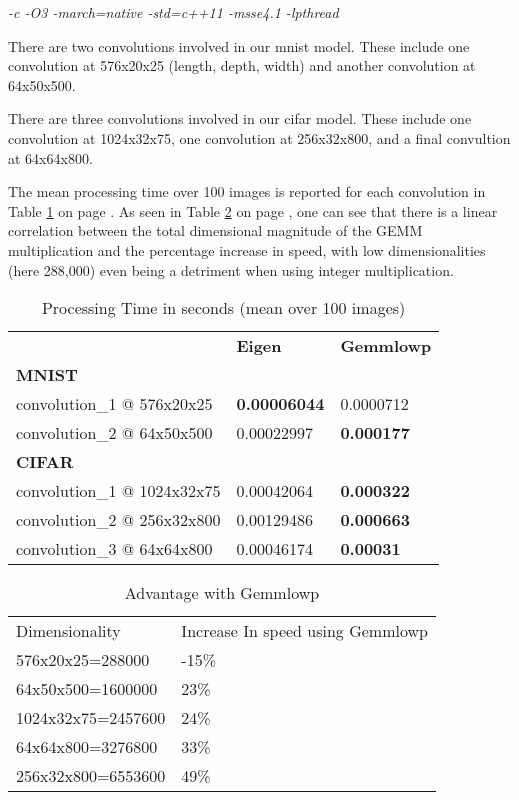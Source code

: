 \documentclass[12pt]{report}
\begin{document}
\textit{-c -O3 -march=native -std=c++11 -msse4.1 -lpthread}

There are two convolutions involved in our mnist model. These include one convolution at 576x20x25 (length, depth, width) and another convolution at 64x50x500.

There are three convolutions involved in our cifar model. These include one convolution at 1024x32x75, one convolution at 256x32x800, and a final convultion at 64x64x800.

The mean processing time over 100 images is reported for each convolution in Table \ref{table:1} on page \pageref{table:1}. As seen in Table \ref{table:2} on page \pageref{table:2}, one can see that there is a linear correlation between the total dimensional magnitude of the GEMM multiplication and the percentage increase in speed, with low dimensionalities (here 288,000) even being a detriment when using integer multiplication.

\begin{table}[h]
\centering
\caption{Processing Time in seconds (mean over 100 images)}
\label{table:1}
\begin{tabular}{lll}
                            & \textbf{Eigen}      & \textbf{Gemmlowp} \\
\textbf{MNIST}              &                     &                   \\
convolution\_1 @ 576x20x25  & \textbf{0.00006044} & 0.0000712         \\
convolution\_2 @ 64x50x500  & 0.00022997          & \textbf{0.000177} \\
\textbf{CIFAR}              &                     &                   \\
convolution\_1 @ 1024x32x75 & 0.00042064          & \textbf{0.000322} \\
convolution\_2 @ 256x32x800 & 0.00129486          & \textbf{0.000663} \\
convolution\_3 @ 64x64x800  & 0.00046174          & \textbf{0.00031} 
\end{tabular}
\end{table}

\begin{table}[h]
\centering
\caption{Advantage with Gemmlowp}
\label{table:2}
\begin{tabular}{ll}
Dimensionality     & Increase In speed using Gemmlowp \\
576x20x25=288000   & -15\%                            \\
64x50x500=1600000  & 23\%                             \\
1024x32x75=2457600 & 24\%                             \\
64x64x800=3276800  & 33\%                             \\
256x32x800=6553600 & 49\%                            
\end{tabular}
\end{table}










\clearpage

\nocite{*}



\end{document}
